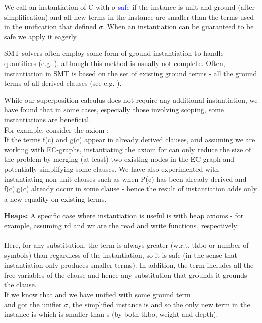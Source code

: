 We call an instantiation of C with $\sigma$ \textcolor{blue}{safe} if the instance is unit and ground (after simplification) and all new terms in the instance are smaller than the terms used in the unification that defined $\sigma$. When an instantiation can be guaranteed to be safe we apply it eagerly.

SMT solvers often employ some form of ground instantiation to handle quantifiers (e.g. \cite{Reynolds:2014:FCI:2682923.2682957}), although this method is usually not complete. Often, instantiation in SMT is based on the set of existing ground terms - all the ground terms of all derived clauses (see e.g. \cite{DBLP:conf/cade/DrossCKP12}).

While our superposition calculus does not require any additional instantiation, we have found that in some cases, especially those involving scoping, some  instantiations are beneficial.\\
For example, consider the axiom :\\
If the terms f(c) and g(c) appear in already derived clauses, and assuming we are working with EC-graphs, instantiating the axiom for  can only reduce the size of the problem by merging (at least) two existing nodes in the EC-graph and potentially simplifying some clauses.
We have also experimented with instantiating non-unit clauses such as  when P(c) has been already derived and f(c),g(c) already occur in some clause - hence the result of instantiation adds only a new equality on existing terms.


\textbf{Heaps:}
A specific case where instantiation is useful is with heap axioms - for example, assuming rd and wr are the read and write functions, respectively:\\
\\
Here, for any substitution, the term  is always greater (w.r.t. tkbo or number of symbols) than  regardless of the instantiation, so it is safe (in the sense that instantiation only produces smaller terms). In addition, the term includes all the free variables of the clause and hence any substitution that grounds it grounds the clause. \\
If we know that  and we have unified  with some ground term\\  and got the unifier $\sigma$, the simplified instance is  and so the only new term in the instance is  which is smaller than s (by both tkbo, weight and depth).


